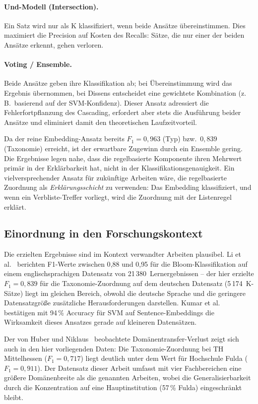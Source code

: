 \paragraph{Und-Modell (Intersection).}
Ein Satz wird nur als K klassifiziert, wenn beide Ansätze übereinstimmen.
Dies maximiert die Precision auf Kosten des Recalls: Sätze, die nur einer der beiden Ansätze erkennt, gehen verloren.

\paragraph{Voting / Ensemble.}
Beide Ansätze geben ihre Klassifikation ab; bei Übereinstimmung wird das Ergebnis übernommen, bei Dissens entscheidet eine gewichtete Kombination (z.\,B.\ basierend auf der SVM-Konfidenz).
Dieser Ansatz adressiert die Fehlerfortpflanzung des Cascading, erfordert aber stets die Ausführung beider Ansätze und eliminiert damit den theoretischen Laufzeitvorteil.

Da der reine Embedding-Ansatz bereits $F_1 = 0{,}963$ (Typ) bzw.\ $0{,}839$ (Taxonomie) erreicht, ist der erwartbare Zugewinn durch ein Ensemble gering.
Die Ergebnisse legen nahe, dass die regelbasierte Komponente ihren Mehrwert primär in der Erklärbarkeit hat, nicht in der Klassifikationsgenauigkeit.
Ein vielversprechender Ansatz für zukünftige Arbeiten wäre, die regelbasierte Zuordnung als \emph{Erklärungsschicht} zu verwenden: Das Embedding klassifiziert, und wenn ein Verbliste-Treffer vorliegt, wird die Zuordnung mit der Listenregel erklärt.

\subsection{Einordnung in den Forschungskontext}\label{sec:einordnung}

Die erzielten Ergebnisse sind im Kontext verwandter Arbeiten plausibel.
Li et al.~\cite{li2022bloomclassification} berichten F1-Werte zwischen 0{,}88 und 0{,}95 für die Bloom-Klassifikation auf einem englischsprachigen Datensatz von 21\,380~Lernergebnissen -- der hier erzielte $F_1 = 0{,}839$ für die Taxonomie-Zuordnung auf dem deutschen Datensatz (5\,174~K-Sätze) liegt im gleichen Bereich, obwohl die deutsche Sprache und die geringere Datensatzgröße zusätzliche Herausforderungen darstellen.
Kumar et al.~\cite{kumar2025automated} bestätigen mit 94\,\% Accuracy für SVM auf Sentence-Embeddings die Wirksamkeit dieses Ansatzes gerade auf kleineren Datensätzen.

Der von Huber und Niklaus~\cite{huber2025llmsblooms} beobachtete Domänentransfer-Verlust zeigt sich auch in den hier vorliegenden Daten: Die Taxonomie-Zuordnung bei TH Mittelhessen ($F_1 = 0{,}717$) liegt deutlich unter dem Wert für Hochschule Fulda ($F_1 = 0{,}911$).
Der Datensatz dieser Arbeit umfasst mit vier Fachbereichen eine größere Domänenbreite als die genannten Arbeiten, wobei die Generalisierbarkeit durch die Konzentration auf eine Hauptinstitution (57\,\% Fulda) eingeschränkt bleibt.

